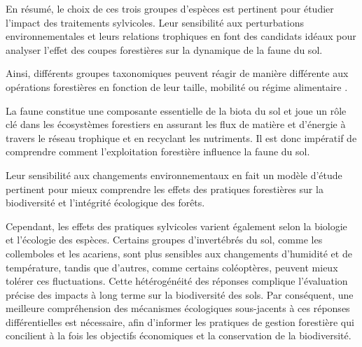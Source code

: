 En résumé, le choix de ces trois groupes d'espèces est pertinent pour étudier l'impact des traitements sylvicoles. 
Leur sensibilité aux perturbations environnementales et leurs relations trophiques en font des candidats idéaux pour analyser l'effet des coupes forestières sur la dynamique de la faune du sol.


Ainsi, différents groupes taxonomiques peuvent réagir de manière différente aux opérations forestières en fonction de leur taille, mobilité ou régime alimentaire \citep{Barlow2007Quantifyingbiodiversity,Stork2009Vulnerabilityresilience}.


La faune constitue une composante essentielle de la biota du sol et joue un rôle clé dans les écosystèmes forestiers en assurant les flux de matière et d'énergie à travers le réseau trophique et en recyclant les nutriments. 
Il est donc impératif de comprendre comment l'exploitation forestière influence la faune du sol.

Leur sensibilité aux changements environnementaux en fait un modèle d’étude pertinent pour mieux comprendre les effets des pratiques forestières sur la biodiversité et l'intégrité écologique des forêts.



 \citep{Kudrin2023metaanalysiseffects}

Cependant, les effets des pratiques sylvicoles varient également selon la biologie et l'écologie des espèces. 
Certains groupes d’invertébrés du sol, comme les collemboles et les acariens, sont plus sensibles aux changements d'humidité et de température, tandis que d'autres, comme certains coléoptères, peuvent mieux tolérer ces fluctuations. 
Cette hétérogénéité des réponses complique l'évaluation précise des impacts à long terme sur la biodiversité des sols. 
Par conséquent, une meilleure compréhension des mécanismes écologiques sous-jacents à ces réponses différentielles est nécessaire, afin d'informer les pratiques de gestion forestière qui concilient à la fois les objectifs économiques et la conservation de la biodiversité.




